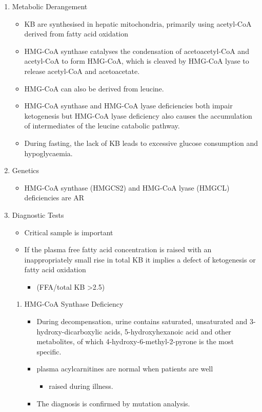 \documentclass{scrartcl}
\begin{document}
\begin{enumerate}
\item Metabolic Derangement
\label{sec:org45e26ad}
\begin{itemize}
\item KB are synthesised in hepatic mitochondria, primarily using
acetyl-CoA derived from fatty acid oxidation
\item HMG-CoA synthase catalyses the condensation of acetoacetyl-CoA and
acetyl-CoA to form HMG-CoA, which is cleaved by HMG-CoA lyase to
release acetyl-CoA and acetoacetate.
\item HMG-CoA can also be derived from leucine.
\item HMG-CoA synthase and HMG-CoA lyase deficiencies both impair
ketogenesis but HMG-CoA lyase deficiency also causes the
accumulation of intermediates of the leucine catabolic pathway.
\item During fasting, the lack of KB leads to excessive glucose
consumption and hypoglycaemia.
\end{itemize}

\item Genetics
\label{sec:org86c8db5}
\begin{itemize}
\item HMG-CoA synthase (HMGCS2) and HMG-CoA lyase (HMGCL) deficiencies are
AR
\end{itemize}

\item Diagnostic Tests
\label{sec:orgc2ee687}
\begin{itemize}
\item Critical sample is important
\item If the plasma free fatty acid concentration is raised with an
inappropriately small rise in total KB it implies a defect of
ketogenesis or fatty acid oxidation 
\begin{itemize}
\item (FFA/total KB >2.5)
\end{itemize}
\end{itemize}

\begin{enumerate}
\item HMG-CoA Synthase Deficiency
\label{sec:orgba1f7d7}
\begin{itemize}
\item During decompensation, urine contains saturated, unsaturated and
3-hydroxy-dicarboxylic acids, 5-hydroxyhexanoic acid and other
metabolites, of which 4-hydroxy-6-methyl-2-pyrone is the most
specific.
\item plasma acylcarnitines are normal when patients are well
\begin{itemize}
\item raised during illness.
\end{itemize}
\item The diagnosis is confirmed by mutation analysis.
\end{itemize}


\end{enumerate}
\end{enumerate}
\end{document}
